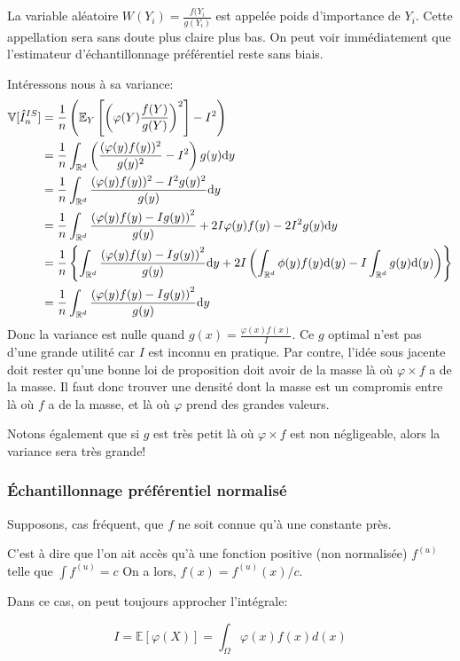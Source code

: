  La variable aléatoire $W(Y_i) = \frac{f(Y_i}{g(Y_i)}$ est appelée poids d'importance de $Y_i$. Cette appellation sera sans doute plus claire plus bas.
On peut voir immédiatement que l'estimateur d'échantillonnage préférentiel reste sans biais.

Intéressons nous à sa variance:
\begin{align*}
\mathbb{V}[\hat{I}^{IS}_n] &= \frac{1}{n}\left(\mathbb{E}_Y\left[\left(\varphi(Y) \frac{f(Y)}{g(Y)}\right)^2\right] - I^2\right)\\
&=\frac{1}{n}\int_{\mathbb{R}^d}\left( \frac{(\varphi(y)f(y))^2}{g(y)^2} - I^2\right) g(y)\text{d} y\\
&= \frac{1}{n}\int_{\mathbb{R}^d} \frac{(\varphi(y)f(y))^2 - I^2g(y)^2}{g(y)} \text{d} y\\
&= \frac{1}{n}\int_{\mathbb{R}^d}\frac{\left(\varphi(y)f(y) - Ig(y)\right)^2}{g(y)} + 2I\varphi(y)f(y) - 2I^2g(y) \text{d} y\\
&=\frac{1}{n}\left\lbrace \int_{\mathbb{R}^d}\frac{\left(\varphi(y)f(y) - Ig(y)\right)^2}{g(y)} \text{d} y  + 2 I\left(\int_{\mathbb{R}^d}\phi(y)f(y)\text{d}(y) -I\int_{\mathbb{R}^d}g(y)\text{d}(y) \right)\right\rbrace\\
&=\frac{1}{n}\int_{\mathbb{R}^d}\frac{\left(\varphi(y)f(y) - Ig(y)\right)^2}{g(y)} \text{d} y
\end{align*}
Donc la variance est nulle quand $g(x) = \frac{\varphi(x)f(x)}{I}$. 
Ce $g$ optimal n'est pas d'une grande utilité car $I$ est inconnu en pratique. Par contre, l'idée sous jacente doit rester qu'une bonne loi de proposition doit avoir de la masse là où $\varphi\times f$ a de la masse. 
Il faut donc trouver une densité dont la masse est un compromis entre là où $f$ a de la masse, et là où $\varphi$ prend des grandes valeurs.

Notons également que si $g$ est très petit là où  $\varphi\times f$ est non négligeable, alors la variance sera très grande!

\subsubsection{Échantillonnage préférentiel normalisé}

Supposons, cas fréquent, que $f$ ne soit connue qu'à une constante près. 

C'est à dire que l'on ait accès qu'à une fonction positive (non normalisée) $f^{(u)}$ telle que $\int f^{(u)} = c$ On a lors, $f(x) = f^{(u)}(x) / c$.

Dans ce cas, on peut toujours approcher l'intégrale:

$$I = \mathbb{E}[\varphi(X)] = \int_{\Omega} \varphi(x) f(x) d(x)$$

